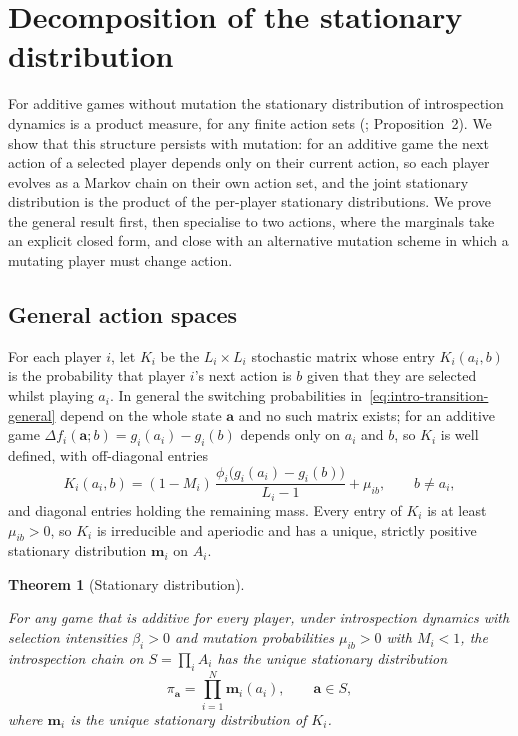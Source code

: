 \documentclass[11pt]{article}
\newtheorem{theorem}{Theorem}
\newcommand{\bfa}{\mathbf{a}}
\newcommand{\bfm}{\mathbf{m}}
\begin{document}
\section{Decomposition of the stationary distribution}\label{sec:decomp}

For additive games without mutation the stationary distribution of
introspection dynamics is a product measure, for any finite action sets
(\cite{couto2023multiplayer}; Proposition~2). We show that this structure
persists with mutation: for an additive game the next action of a selected
player depends only on their current action, so each player evolves as a
Markov chain on their own action set, and the joint stationary distribution
is the product of the per-player stationary distributions. We prove the
general result first, then specialise to two actions, where the marginals
take an explicit closed form, and close with an alternative mutation scheme
in which a mutating player must change action.

\subsection{General action spaces}\label{sec:general}

For each player \(i\), let \(K_i\) be the \(L_i\times L_i\) stochastic matrix
whose entry \(K_i(a_i,b)\) is the probability that player \(i\)'s next action
is \(b\) given that they are selected whilst playing \(a_i\). In general the
switching probabilities in~\eqref{eq:intro-transition-general} depend on the
whole state \(\bfa\) and no such matrix exists; for an additive game
\(\Delta f_i(\bfa;b)=g_i(a_i)-g_i(b)\) depends only on \(a_i\) and \(b\), so
\(K_i\) is well defined, with off-diagonal entries
\begin{equation}\label{eq:kernel}
  K_i(a_i,b)
  = (1-M_i)\,\frac{\phi_i\bigl(g_i(a_i)-g_i(b)\bigr)}{L_i-1}+\mu_{ib},
  \qquad b\neq a_i,
\end{equation}
and diagonal entries holding the remaining mass. Every entry of \(K_i\) is at
least \(\mu_{ib}>0\), so \(K_i\) is irreducible and aperiodic and has a
unique, strictly positive stationary distribution \(\bfm_i\) on \(A_i\).

\begin{theorem}[Stationary distribution]\label{thm:general}

For any game that is additive for every player, under introspection dynamics
with selection intensities \(\beta_i>0\) and mutation probabilities
\(\mu_{ib}>0\) with \(M_i<1\), the introspection chain on
\(S=\prod_{i}A_i\) has the unique stationary distribution
\begin{equation}\label{eq:stationary-general}
  \pi_{\bfa} = \prod_{i=1}^{N} \bfm_i(a_i), \qquad \bfa\in S,
\end{equation}
where \(\bfm_i\) is the unique stationary distribution of \(K_i\).

\end{theorem}
\end{document}
